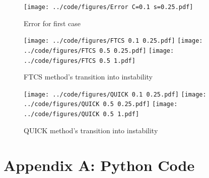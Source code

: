 \documentclass[twocolumn,10pt]{asme2ej}
\begin{document}
\begin{figure}[thb]
\begin{center}
\texttt{[image: ../code/figures/Error C=0.1 s=0.25.pdf]}
\caption{Error for first case}
\label{case_1_error}
\end{center}
\end{figure}

\begin{figure}[thb]
\begin{center}
\texttt{[image: ../code/figures/FTCS 0.1 0.25.pdf]}
\texttt{[image: ../code/figures/FTCS 0.5 0.25.pdf]}
\texttt{[image: ../code/figures/FTCS 0.5 1.pdf]}
\caption{FTCS method's transition into instability}
\label{FTCS_transition}
\end{center}
\end{figure}

\begin{figure}[thb]
\begin{center}
\texttt{[image: ../code/figures/QUICK 0.1 0.25.pdf]}
\texttt{[image: ../code/figures/QUICK 0.5 0.25.pdf]}
\texttt{[image: ../code/figures/QUICK 0.5 1.pdf]}
\caption{QUICK method's transition into instability}
\label{QUICK_transition}
\end{center}
\end{figure}

\clearpage
\onecolumn
\appendix       %
\section*{Appendix A: Python Code}




\end{document}
